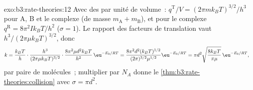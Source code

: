 \begin{solution}{exo:b3:rate-theories:12}
Avec des  par unité de volume~:
$q^{\mathrm T}/V = (2\pi mk_BT)^{3/2}/h^3$ pour
A, B et le complexe (de masse $m_{\mathrm A} + m_{\mathrm B}$), et pour le complexe $q^{\mathrm R} = 8\pi^2Ik_BT/h^2$
($\sigma = 1$). Le rapport des facteurs de translation vaut
$h^3/(2\pi\mu k_BT)^{3/2}$, donc
\[
  k = \frac{k_BT}{h}\cdot\frac{h^3}{(2\pi\mu k_BT)^{3/2}}\cdot\frac{8\pi^2\mu d^2k_BT}{h^2}\,\eu^{-E_0/RT}
    = \frac{8\pi^2d^2(k_BT)^{1/2}}{(2\pi)^{3/2}\mu^{1/2}}\eu^{-E_0/RT}
    = \pi d^2\sqrt{\frac{8k_BT}{\pi\mu}}\,\eu^{-E_0/RT},
\]
par paire de molécules~; multiplier par $N_A$ donne le
\cref{thm:b3:rate-theories:collision}
avec $\sigma = \pi d^2$.
\end{solution}

